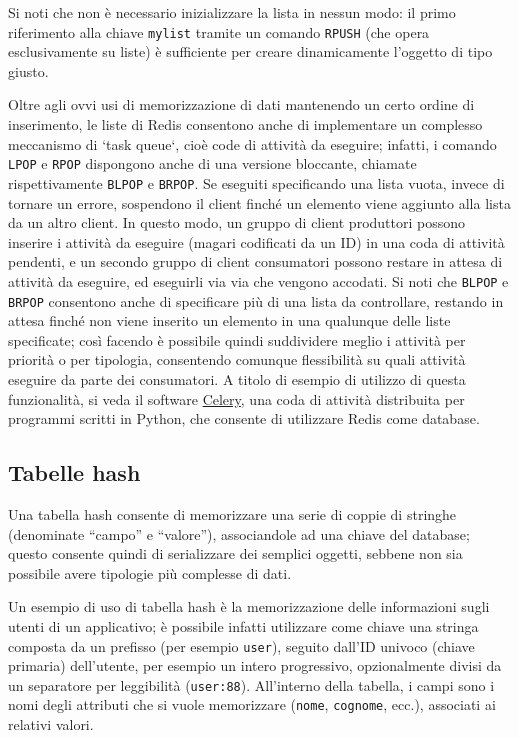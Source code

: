 Si noti che non è necessario inizializzare la lista in nessun modo: il primo riferimento alla chiave
\verb|mylist| tramite un comando \verb|RPUSH| (che opera esclusivamente su liste) è sufficiente
per creare dinamicamente l'oggetto di tipo giusto.

Oltre agli ovvi usi di memorizzazione di dati mantenendo un certo ordine di inserimento, le liste di
Redis consentono anche di implementare un complesso meccanismo di `task queue`, cioè code di
attività da eseguire; infatti, i comando \verb|LPOP| e \verb|RPOP| dispongono anche di una versione
bloccante, chiamate rispettivamente \verb|BLPOP| e \verb|BRPOP|. Se eseguiti specificando una lista
vuota, invece di tornare un errore, sospendono il client finché un elemento viene aggiunto alla
lista da un altro client. In questo modo, un gruppo di client produttori possono inserire i attività
da eseguire (magari codificati da un ID) in una coda di attività pendenti, e un secondo gruppo di
client consumatori possono restare in attesa di attività da eseguire, ed eseguirli via via che
vengono accodati. Si noti che \verb|BLPOP| e \verb|BRPOP| consentono anche di specificare più di una
lista da controllare, restando in attesa finché non viene inserito un elemento in una qualunque
delle liste specificate; così facendo è possibile quindi suddividere meglio i attività per priorità
o per tipologia, consentendo comunque flessibilità su quali attività eseguire da parte dei
consumatori. A titolo di esempio di utilizzo di questa funzionalità, si veda il software
\href{http://celery.readthedocs.io/en/latest/}{Celery}, una coda di attività distribuita per
programmi scritti in Python, che consente di utilizzare Redis come database.


\subsection{Tabelle hash}

Una tabella hash consente di memorizzare una serie di coppie di stringhe (denominate ``campo'' e
``valore''), associandole ad una chiave del database; questo consente quindi di serializzare dei
semplici oggetti, sebbene non sia possibile avere tipologie più complesse di dati.

Un esempio di uso di tabella hash è la memorizzazione delle informazioni sugli utenti di un
applicativo; è possibile infatti utilizzare come chiave una stringa composta da un prefisso (per
esempio \verb|user|), seguito dall'ID univoco (chiave primaria) dell'utente, per esempio un intero
progressivo, opzionalmente divisi da un separatore per leggibilità (\verb|user:88|). All'interno
della tabella, i campi sono i nomi degli attributi che si vuole memorizzare (\verb|nome|,
\verb|cognome|, ecc.), associati ai relativi valori.

